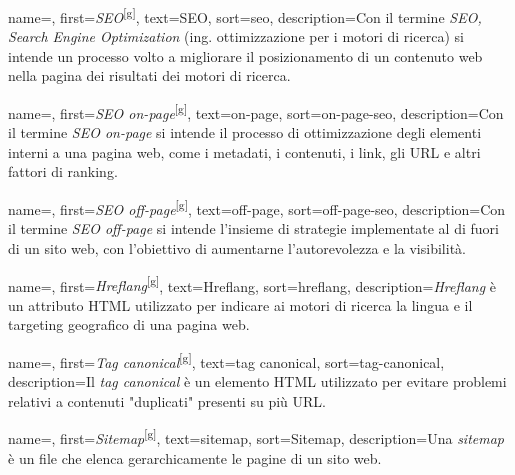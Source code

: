 

 {
    name=,
    first={\textit{SEO}\textsuperscript{[g]}},
    text=SEO,
    sort=seo,
    description={Con il termine \emph{SEO, Search Engine Optimization} (ing. ottimizzazione per i motori di ricerca) si intende un processo volto a migliorare il posizionamento di un contenuto web nella pagina dei risultati dei motori di ricerca.}
}

 {
    name=,
    first={\textit{SEO on-page}\textsuperscript{[g]}},
    text=on-page,
    sort=on-page-seo,
    description={Con il termine \emph{SEO on-page} si intende il processo di ottimizzazione degli elementi interni a una pagina web, come i metadati, i contenuti, i link, gli URL e altri fattori di ranking.}
}

 {
    name=,
    first={\textit{SEO off-page}\textsuperscript{[g]}},
    text=off-page,
    sort=off-page-seo,
    description={Con il termine \emph{SEO off-page} si intende l'insieme di strategie implementate al di fuori di un sito web, con l'obiettivo di aumentarne l'autorevolezza e la visibilità.}
}

 {
    name=,
    first={\textit{Hreflang}\textsuperscript{[g]}},
    text=Hreflang,
    sort=hreflang,
    description={\emph{Hreflang} è un attributo HTML utilizzato per indicare ai motori di ricerca la lingua e il targeting geografico di una pagina web.}
}

 {
    name=,
    first={\textit{Tag canonical}\textsuperscript{[g]}},
    text=tag canonical,
    sort=tag-canonical,
    description={Il \emph{tag canonical} è un elemento HTML utilizzato per evitare problemi relativi a contenuti "duplicati" presenti su più URL.}
}

 {
    name=,
    first={\textit{Sitemap}\textsuperscript{[g]}},
    text=sitemap,
    sort=Sitemap,
    description={Una \emph{sitemap} è un file che elenca gerarchicamente le pagine di un sito web.}
}

